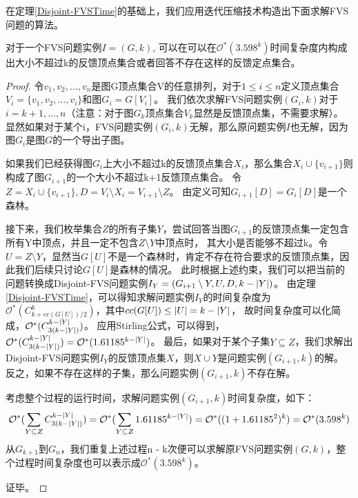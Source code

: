 在定理\ref{Disjoint-FVSTime}的基础上，我们应用迭代压缩技术构造出下面求解FVS问题的算法。
\begin{theorem}
对于一个FVS问题实例$I = (G, k)$, 可以在可以在$\mathcal{O}^*(3.598^k)$时间复杂度内构成出大小不超过k的反馈顶点集合或者回答不存在这样的反馈定点集合。
\end{theorem}
\begin{proof}
令$v_1, v_2, ..., v_n$是图G顶点集合V的任意排列，对于$1 \le i \le n$定义顶点集合$V_i = \{v_1, v_2, ..., v_i\}$和图$G_i = G[V_i]$。
我们依次求解FVS问题实例$(G_i, k)$对于$i = k+1, ..., n$（注意：对于图$G_k$顶点集合$V_k$显然是反馈顶点集，不需要求解）。
显然如果对于某个i，FVS问题实例$(G_i, k)$无解，那么原问题实例$I$也无解，因为图$G_i$是图$G$的一个导出子图。

如果我们已经获得图$G_i$上大小不超过k的反馈顶点集合$X_i$，那么集合$X_i \cup \{v_{i+1}\}$则构成了图$G_{i+1}$的一个大小不超过k+1反馈顶点集合。
令$Z = X_i \cup \{v_{i+1}\}, D = V_i \setminus X_i = V_{i+1} \setminus Z$。
由定义可知$G_{i+1}[D] = G_i[D]$是一个森林。

接下来，我们枚举集合$Z$的所有子集$Y$，尝试回答当图$G_{i+1}$的反馈顶点集一定包含所有Y中顶点，并且一定不包含$Z \setminus Y$中顶点时，
其大小是否能够不超过k。令$U = Z \setminus Y$，显然当$G[U]$不是一个森林时，肯定不存在符合要求的反馈顶点集，因此我们后续只讨论$G[U]$是森林的情况。
此时根据上述约束，我们可以把当前的问题转换成Disjoint-FVS问题实例$I_Y = (G_{i+1} \setminus Y, U, D, k-\left\vert Y \right\vert)$。
由定理\ref{Disjoint-FVSTime}，可以得知求解问题实例$I_Y$的时间复杂度为$\mathcal{O}^*(C^k_{k + cc(G[U])/2})$，其中$cc(G[U]) \le \left\vert U \right\vert = k - \left\vert Y \right\vert$，
故时间复杂度可以化简成，$\mathcal{O}^*(C^{k - \left\vert Y \right\vert}_{3(k - \left\vert Y \right\vert)})$。
应用Stirling公式，可以得到，$\mathcal{O}^*(C^{k - \left\vert Y \right\vert}_{3(k - \left\vert Y \right\vert)}) = \mathcal{O}^*(1.61185^{k - \left\vert Y \right\vert})$。
最后，如果对于某个子集$Y \subseteq Z$，我们求解出Disjoint-FVS问题实例$I_Y$的反馈顶点集$X$，则$X \cup Y$是问题实例$(G_{i+1}, k)$的解。
反之，如果不存在这样的子集，那么问题实例$(G_{i+1}, k)$不存在解。

考虑整个过程的运行时间，求解问题实例$(G_{i+1}, k)$时间复杂度，如下：
\begin{equation*}
  \mathcal{O}^*(\sum_{Y \subseteq Z}C^{k - \left\vert Y \right\vert}_{3(k - \left\vert Y \right\vert)}) \\
   = \mathcal{O}^*(\sum_{Y \subseteq Z}1.61185^{k - \left\vert Y \right\vert})
   = \mathcal{O}^*((1 + 1.61185^2)^k) = \mathcal{O}^*(3.598^k)
\end{equation*}
从$G_{k+1}$到$G_n$，我们重复上述过程n - k次便可以求解原FVS问题实例$(G, k)$，整个过程时间复杂度也可以表示成$\mathcal{O}^*(3.598^k)$。

证毕。
\end{proof}
